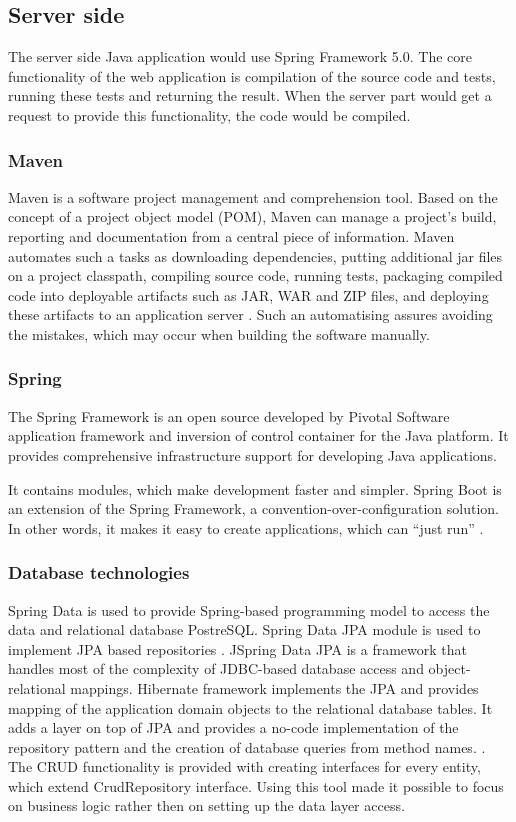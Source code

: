 \subsection{Server side}
The server side Java application would use Spring Framework 5.0. The core functionality of the web application is compilation of the source code and tests, running these tests and returning the result. When the server part would get a request to provide this functionality, the code would be compiled.

\subsubsection{Maven}
Maven is a software project management and comprehension tool. Based on the concept of a project object model (POM), Maven can manage a project's build, reporting and documentation from a central piece of information. Maven automates such a tasks as downloading dependencies, putting additional jar files on a project classpath, compiling source code, running tests, packaging compiled code into deployable artifacts such as JAR, WAR and ZIP files, and deploying these artifacts to an application server \cite{maven}. Such an automatising assures avoiding the mistakes, which may occur when building the software manually.

\subsubsection{Spring}

The Spring Framework is an open source developed by Pivotal Software application framework and inversion of control container for the Java platform. It provides comprehensive infrastructure support for developing Java applications. 

It contains modules, which make development faster and simpler. Spring Boot is an extension of the Spring Framework, a convention-over-configuration solution. In other words, it makes it easy to create applications, which can ``just run'' \cite{spring_boot}.

\subsubsection{Database technologies}
Spring Data is used to provide Spring-based programming model to access the data and relational database PostreSQL. Spring Data JPA module is used to implement JPA based repositories \cite{spring_data}. JSpring Data JPA is a framework that handles most of the complexity of JDBC-based database access and object-relational mappings. Hibernate framework implements the JPA and provides mapping of the application domain objects to the relational database tables. It adds a layer on top of JPA and provides a no-code implementation of the repository pattern and the creation of database queries from method names. \cite[Part VI, Persistence]{jpa}. The CRUD functionality is provided with creating interfaces for every entity, which extend CrudRepository interface. Using this tool made it possible to focus on business logic rather then on setting up the data layer access.

